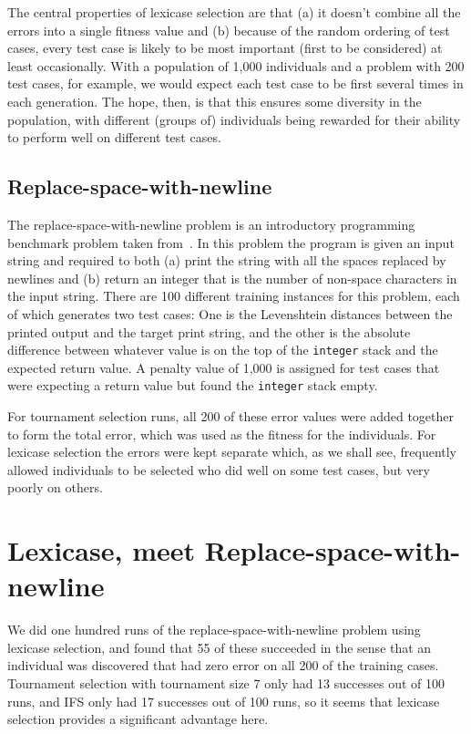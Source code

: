 The central properties of lexicase selection are that (a) it doesn't combine all the errors into a single
fitness value and (b) because of the random ordering of test cases, every test case is likely to be
most important (first to be considered) at least occasionally. With a population of 1,000 individuals
and a problem with 200 test cases, for example, we would expect each test case to be first several
times in each generation. The hope, then, is that this ensures some diversity in the population, with
different (groups of) individuals being rewarded for their ability to perform well on different test
cases.

\subsection{Replace-space-with-newline}

The replace-space-with-newline problem is an introductory programming benchmark problem taken
from~\cite{Helmuth:2015:GECCO}. In this problem the program is given an input string and required to
both (a) print the string with all the spaces replaced by newlines and (b) return an integer that
is the number of non-space characters in the input string. There are 100 different training instances 
for this problem, each of which generates two test cases: One is the Levenshtein distances between
the printed output and the target print string, and the other is the absolute difference between
whatever value is on the top of the \texttt{integer} stack and the expected return value. A penalty
value of 1,000 is assigned for test cases that were expecting a return value but found the
\texttt{integer} stack empty.

For tournament selection runs, all 200 of these error values were added together to form the
total error, which was used as the fitness for the individuals. For lexicase selection the errors
were kept separate which, as we shall see, frequently allowed individuals to be selected who did 
well on some test cases, but very poorly on others.

\section{Lexicase, meet Replace-space-with-newline}
\label{sec:lexicaseRun}

We did one hundred runs of the replace-space-with-newline problem using lexicase selection, and
found that 55 of these succeeded in the sense that an individual was discovered that had zero
error on all 200 of the training cases. Tournament selection with tournament size 7 only
had 13 successes out of 100 runs, and IFS only had 17 successes out of 100 runs, so it seems that
lexicase selection provides a significant advantage here.

